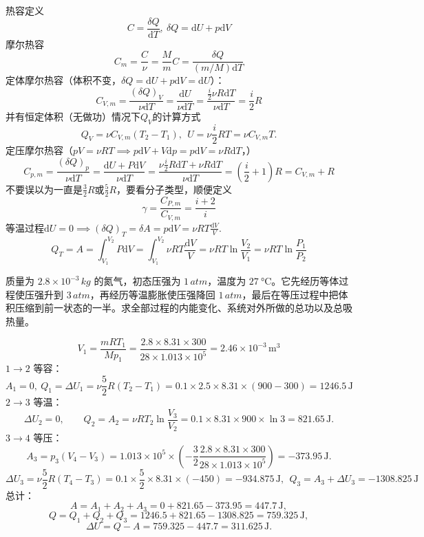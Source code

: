 \documentclass[lang=cn,11pt]{elegantbook}
\begin{document}
\begin{definition}[热容]
    热容定义\[C=\frac{\delta Q}{\mathrm dT},~\delta Q=\mathrm dU+p\mathrm dV\]
    摩尔热容\[C_m=\frac{C}{\nu}=\frac{M}{m}C=\frac{\delta Q}{(m/M)\mathrm dT}\]
    定体摩尔热容（体积不变，$\delta Q=\mathrm dU+p\mathrm dV=\mathrm dU$）：\[C_{V,m}=\frac{(\delta Q)_V}{\nu\mathrm dT}=\frac{\mathrm dU}{\nu\mathrm dT}=\frac{\frac{i}{2}\nu R\mathrm dT}{\nu\mathrm dT}=\frac{i}{2}R\]
    并有恒定体积（无做功）情况下$Q_V$的计算方式\[Q_V=\nu C_{V,m}(T_2-T_1),~~U=\nu\frac{i}{2}RT=\nu C_{V,m}T.\]
    定压摩尔热容（$pV=\nu RT\implies p\mathrm dV+V\mathrm dp=p\mathrm dV=\nu R\mathrm dT$，）
    \[C_{p,m}=\frac{(\delta Q)_p}{\nu\mathrm dT}=\frac{\mathrm dU+P\mathrm dV}{\nu\mathrm dT}=\frac{\nu\frac{i}{2}R\mathrm dT+\nu R\mathrm dT}{\nu\mathrm dT}=\left(\frac{i}{2}+1\right)R=C_{V,m}+R\]
    不要误以为一直是$\frac{3}{2}R$或$\frac{5}{2}R$，要看分子类型，顺便定义\[\gamma=\frac{C_{P,m}}{C_{V,m}}=\frac{i+2}{i}\]
    等温过程\(\mathrm dU=0\implies(\delta Q)_T=\delta A=p\mathrm dV=\nu RT\frac{\mathrm{d}V}{V}.\)
    \[Q_T=A=\int_{V_1}^{V_2}P\mathrm dV=\int_{V_1}^{V_2}\nu RT\frac{\mathrm{d}V}{V}=\nu RT\ln\frac{V_2}{V_1}=\nu RT\ln\frac{P_1}{P_2}\]
\end{definition} 

\begin{exercise}
质量为 \(2.8\times10^{-3}\,\si{kg}\) 的氮气，初态压强为 \(1\,\si{atm}\)，温度为 \(\SI{27}{\celsius}\)。它先经历等体过程使压强升到 \(3\,\si{atm}\)，再经历等温膨胀使压强降回 \(1\,\si{atm}\)，最后在等压过程中把体积压缩到前一状态的一半。求全部过程的内能变化、系统对外所做的总功以及总吸热量。
\end{exercise}
\begin{solution}
\[V_1=\frac{mRT_1}{Mp_1}=\frac{2.8\times 8.31\times 300}{28\times 1.013\times 10^5}=2.46\times10^{-3}\,\text{m}^3\]
\(1\to2\) 等容：
\[
A_1=0,~ Q_1=\Delta U_1=\nu\frac{5}{2}R(T_2-T_1)=0.1\times 2.5\times 8.31\times (900-300)=1246.5\,\text{J}
\]
\(2\to3\) 等温：
\[
\Delta U_2=0,\qquad Q_2=A_2=\nu RT_2\ln\frac{V_3}{V_2}=0.1\times 8.31\times 900\times \ln3=821.65\,\text{J}.
\]
\(3\to4\) 等压：
\[A_3=p_3(V_4-V_3)=1.013\times 10^5\times \left(-\frac32\frac{2.8\times 8.31\times 300}{28\times 1.013\times 10^5}\right)=-373.95\,\text{J}.\]
\[\Delta U_3=\nu\frac{5}{2}R(T_4-T_3)=0.1\times\frac52\times 8.31\times(-450)=-934.875\,\text{J},~~Q_3=A_3+\Delta U_3=-1308.825\,\text{J}\]
总计：
\[
A=A_1+A_2+A_3=0+821.65-373.95=447.7\,\text{J},
\]\[
Q=Q_1+Q_2+Q_3=1246.5+821.65-1308.825=759.325\,\text{J},
\]\[
\Delta U=Q-A=759.325-447.7=311.625\,\text{J}.
\]
\end{solution}
\end{document}
